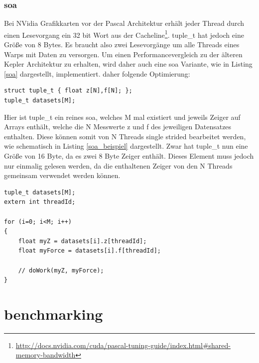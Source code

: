 \subsection{\acrlong{soa}}
Bei NVidia Grafikkarten vor der Pascal Architektur erhält jeder Thread durch einen Lesevorgang ein 32 bit Wort aus der Cacheline\footnote{\href{http://docs.nvidia.com/cuda/pascal-tuning-guide/index.html\#shared-memory-bandwidth}{http://docs.nvidia.com/cuda/pascal-tuning-guide/index.html\#shared-memory-bandwidth}}. tuple\_t hat jedoch eine Größe von 8 Bytes. 
Es braucht also zwei Lesevorgänge um alle Threads eines Warps mit Daten zu versorgen.
Um einen Performancevergleich zu der älteren Kepler Architektur zu erhalten, wird daher auch eine \gls{soa} Variante, wie in Listing \ref{soa} dargestellt, implementiert.
daher folgende Optimierung:

\begin{lstlisting}[label=soa,caption=\gls{soa}]
struct tuple_t { float z[N],f[N]; };
tuple_t datasets[M];
\end{lstlisting}

Hier ist tuple\_t ein reines \gls{soa}, welches M mal existiert und jeweils Zeiger auf Arrays enthält, welche die N Messwerte z und f des jeweiligen Datensatzes enthalten. Diese können somit von N Threads single strided bearbeitet werden, wie schematisch in Listing \ref{soa_beispiel} dargestellt.
Zwar hat tuple\_t nun eine Größe von 16 Byte, da es zwei 8 Byte Zeiger enthält. Dieses Element muss jedoch nur einmalig gelesen werden, da die enthaltenen Zeiger von den N Threads gemeinsam verwendet werden können.

\begin{lstlisting}[label=soa_beispiel,caption=Bearbeitung eines \gls{soa}]
tuple_t datasets[M];
extern int threadId;

for (i=0; i<M; i++)
{
    float myZ = datasets[i].z[threadId];
    float myForce = datasets[i].f[threadId];
    
    // doWork(myZ, myForce);
}
\end{lstlisting}


\chapter{benchmarking}
%
%



